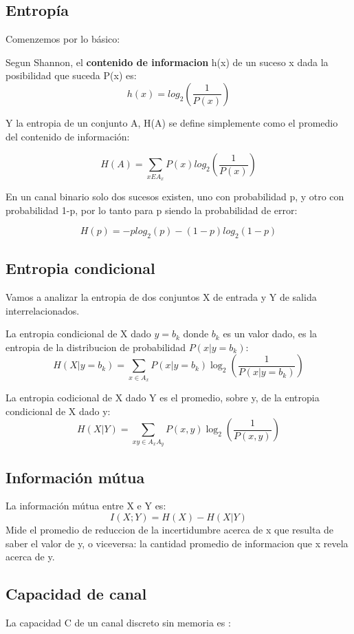 \subsection{Entropía}

Comenzemos por lo básico:

Segun Shannon, el \textbf{contenido de informacion} h(x) de un suceso x dada la posibilidad que suceda P(x) es:
$$ h(x) = log_{2}\left(\frac{1}{P(x)}\right) $$

Y la entropia de un conjunto A, H(A) se define simplemente como el promedio del contenido de información:

$$ H(A) = \sum_{x E A_{x}} P(x)log_{2}\left(\frac{1}{P(x)}\right)$$

En un canal binario solo dos sucesos existen, uno con probabilidad p, y otro con probabilidad 1-p, por lo tanto para p siendo la probabilidad de error:

$$ H(p) = -p log_{2}(p)-(1-p)log_{2}(1-p) $$

\subsection{Entropia condicional}

Vamos a analizar la entropia de dos conjuntos X de entrada y Y de salida interrelacionados.

La entropia condicional de X dado $y=b_k$ donde $b_k$ es un valor dado, es la entropia de la distribucion de probabilidad $P(x|y=b_{k})$:
$$H(X|y=b_{k}) = \sum_{x \in A_{x}} P(x | y=b_{k})\log_2\left(\frac{1}{P(x | y=b_{k})}\right) $$

La entropia codicional de X dado Y es el promedio, sobre y, de la entropia condicional de X dado y:
$$H(X|Y) =  \sum_{xy \in A_{x}A_{y}} P(x,y)\log_2\left(\frac{1}{P(x,y)}\right) $$

\subsection{Información mútua}
La información mútua entre X e Y es:
$$I(X;Y) = H(X)-H(X|Y)$$
Mide el promedio de reduccion de la incertidumbre acerca de x que resulta de saber el valor de y, o viceversa: la cantidad promedio de informacion que x revela acerca de y.

\subsection{Capacidad de canal}

La capacidad C de un canal discreto sin memoria es :

